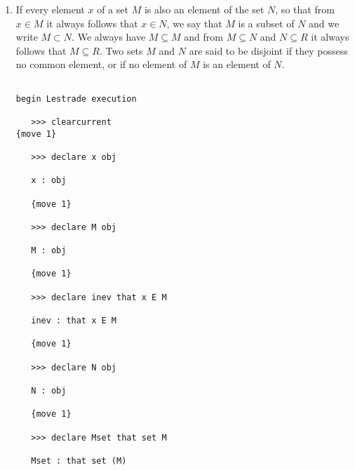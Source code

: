 \documentclass[12pt]{article}
\begin{document}
\begin{enumerate}
\begin{verbatim}
   {move 1}

   >>> postulate E a b prop

   E : [(a_1 : obj), (b_1 : obj) => 
       (--- : prop)]

   {move 0}

   >>> declare inev that a E b

   inev : that a E b

   {move 1}

   >>> postulate Proveset inev that set b

   Proveset : [(.a_1 : obj), (.b_1 : obj), (inev_1 
       : that .a_1 E .b_1) => (--- : that 
       set (.b_1))]

   {move 0}
end Lestrade execution

\end{verbatim}

Here we have declared membership and the rule of deduction from an object having an element to its being a set.

\item  If every element $x$ of a set $M$ is also an element of the set $N$, so that from $x \in M$ it always follows that $x \in N$,
we say that $M$ is a subset of $N$ and we write $M \subset N$.  We always have $M \subseteq M$ and from $M \subseteq N$ and
$N \subseteq R$ it always follows that $M \subseteq R$.  Two sets $M$ and $N$ are said to be disjoint if they possess no common
element, or if no element of $M$ is an element of $N$.

\begin{verbatim}

begin Lestrade execution

   >>> clearcurrent
{move 1}

   >>> declare x obj

   x : obj

   {move 1}

   >>> declare M obj

   M : obj

   {move 1}

   >>> declare inev that x E M

   inev : that x E M

   {move 1}

   >>> declare N obj

   N : obj

   {move 1}

   >>> declare Mset that set M

   Mset : that set (M)


\end{verbatim}
\end{enumerate}
\end{document}
